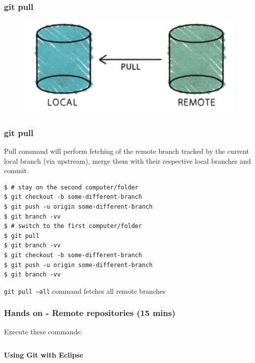 \documentclass{beamer}
\begin{document}
\begin{frame}[fragile]
\frametitle{git pull}
\begin{figure}

  \includegraphics[scale=0.3]{figures/f7.png}
\end{figure}
\end{frame}

\begin{frame}[fragile]
\frametitle{git pull}

Pull command will perform fetching of the remote branch tracked by the
current local branch (via upstream), merge them with their
respective local branches and commit.


\begin{lstlisting}
$ # stay on the second computer/folder
$ git checkout -b some-different-branch
$ git push -u origin some-different-branch
$ git branch -vv
$ # switch to the first computer/folder
$ git pull
$ git branch -vv
$ git checkout -b some-different-branch
$ git push -u origin some-different-branch
$ git branch -vv
\end{lstlisting}

\texttt{git pull ---all} command fetches all remote branches

\end{frame}

\begin{frame}[fragile]
\frametitle{Hands on - Remote repositories (15 mins)}

Execute these commands:

\begin{lstlisting}
\end{lstlisting}
\end{frame}


\begin{frame}
\LARGE	
\textbf{Using Git with Eclipse}
\end{frame}
\end{document}

